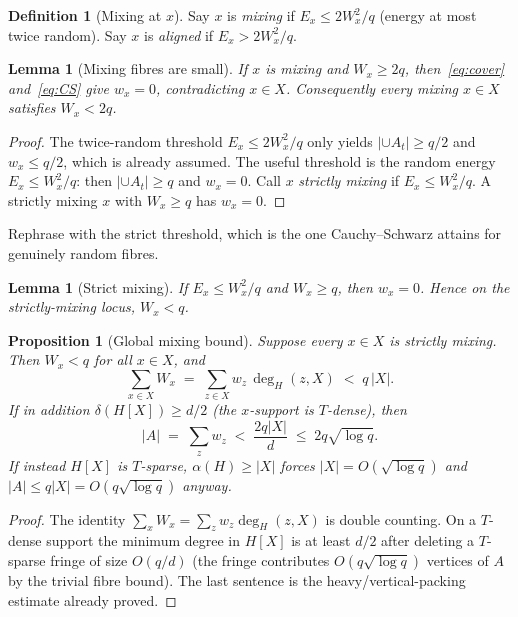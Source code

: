 \documentclass[11pt]{article}
\newtheorem{lemma}[theorem]{Lemma}
\newtheorem{proposition}[theorem]{Proposition}
\theoremstyle{definition}
\newtheorem{definition}[theorem]{Definition}
\begin{document}
\begin{definition}[Mixing at $x$]
Say $x$ is \emph{mixing} if $E_x\le 2W_x^{2}/q$ (energy at most twice random).
Say $x$ is \emph{aligned} if $E_x>2W_x^{2}/q$.
\end{definition}

\begin{lemma}[Mixing fibres are small]\label{lem:mix}
If $x$ is mixing and $W_x\ge 2q$, then~\eqref{eq:cover} and~\eqref{eq:CS} give $w_x=0$, contradicting $x\in X$.
Consequently every mixing $x\in X$ satisfies $W_x<2q$.
\end{lemma}

\begin{proof}
The twice-random threshold $E_x\le 2W_x^{2}/q$ only yields $|\cup A_t|\ge q/2$ and $w_x\le q/2$, which is already assumed.
The useful threshold is the random energy $E_x\le W_x^{2}/q$: then $|\cup A_t|\ge q$ and $w_x=0$.
Call $x$ \emph{strictly mixing} if $E_x\le W_x^{2}/q$.
A strictly mixing $x$ with $W_x\ge q$ has $w_x=0$.
\end{proof}

Rephrase with the strict threshold, which is the one Cauchy--Schwarz attains for genuinely random fibres.

\begin{lemma}[Strict mixing]\label{lem:strict}
If $E_x\le W_x^{2}/q$ and $W_x\ge q$, then $w_x=0$.
Hence on the strictly-mixing locus, $W_x<q$.
\end{lemma}

\begin{proposition}[Global mixing bound]\label{prop:mix-global}
Suppose every $x\in X$ is strictly mixing.
Then $W_x<q$ for all $x\in X$, and
\[
  \sum_{x\in X}W_x
  \;=\;
  \sum_{z\in X}w_z\,\deg_H(z,X)
  \;<\;
  q\,|X|.
\]
If in addition $\delta(H[X])\ge d/2$ (the $x$-support is $T$-dense), then
\[
  |A|
  \;=\;
  \sum_z w_z
  \;<\;
  \frac{2q|X|}{d}
  \;\le\;
  2q\sqrt{\log q}.
\]
If instead $H[X]$ is $T$-sparse, $\alpha(H)\ge|X|$ forces $|X|=O(\sqrt{\log q})$ and $|A|\le q|X|=O(q\sqrt{\log q})$ anyway.
\end{proposition}

\begin{proof}
The identity $\sum_x W_x=\sum_z w_z\deg_H(z,X)$ is double counting.
On a $T$-dense support the minimum degree in $H[X]$ is at least $d/2$ after deleting a $T$-sparse fringe of size $O(q/d)$ (the fringe contributes $O(q\sqrt{\log q})$ vertices of $A$ by the trivial fibre bound).
The last sentence is the heavy/vertical-packing estimate already proved.
\end{proof}
\end{document}
